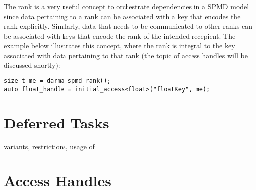 The rank is a very useful concept to orchestrate dependencies in a SPMD model since data pertaining to a rank can be associated
with a key that encodes the rank explicitly. Similarly, data that needs to be communicated to other ranks can be associated with
keys that encode the rank of the intended recepient. The example below illustrates this concept, where the rank is integral to
the key associated with data pertaining to that rank (the topic of access handles will be discussed shortly):
\begin{lstlisting}
size_t me = darma_spmd_rank();
auto float_handle = initial_access<float>("floatKey", me);
\end{lstlisting}  


\section{Deferred Tasks}
\label{sec:deferred}

variants, restrictions, usage of 


\section{Access Handles}
\label{sec:handles}









